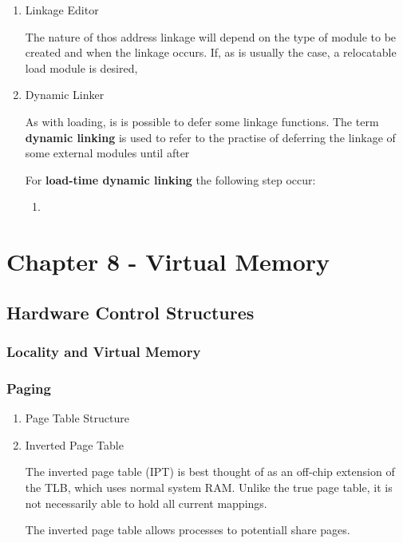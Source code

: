 \documentclass[11pt]{article}
\begin{document}
\begin{enumerate}
\item Linkage Editor
\label{sec:orgheadline25}

The nature of thos address linkage will depend on the type of module 
to be created and when the linkage occurs. If, as is usually the case, 
a relocatable load module is desired, 

\item Dynamic Linker
\label{sec:orgheadline26}

As with loading, is is possible to defer some linkage functions. 
The term \textbf{dynamic linking} is used to refer to the practise of deferring 
the linkage of some external modules until after

For \textbf{load-time dynamic linking} the following step occur:

\begin{enumerate}
\item 
\end{enumerate}
\end{enumerate}


\section{Chapter 8 - Virtual Memory}
\label{sec:orgheadline85}

\subsection{Hardware Control Structures}
\label{sec:orgheadline38}

\subsubsection{Locality and Virtual Memory}
\label{sec:orgheadline30}



\subsubsection{Paging}
\label{sec:orgheadline33}

\begin{enumerate}
\item Page Table Structure
\label{sec:orgheadline31}


\item Inverted Page Table
\label{sec:orgheadline32}

The inverted page table (IPT) is best thought of as an off-chip extension 
of the TLB, which uses normal system RAM. Unlike the true page table, it 
is not necessarily able to hold all current mappings.

The inverted page table allows processes to potentiall share pages.
\end{enumerate}
\end{document}

